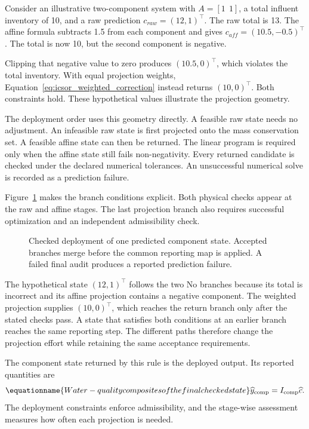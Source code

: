 Consider an illustrative two-component system with \(A=[1\ \ 1]\), a total influent inventory of 10, and a raw prediction \(c_{raw}=(12,1)^\top\). The raw total is 13. The affine formula subtracts 1.5 from each component and gives \(c_{aff}=(10.5,-0.5)^\top\). The total is now 10, but the second component is negative.

Clipping that negative value to zero produces \((10.5,0)^\top\), which violates the total inventory. With equal projection weights, Equation~\eqref{eq:icsor_weighted_correction} instead returns \((10,0)^\top\). Both constraints hold. These hypothetical values illustrate the projection geometry.

The deployment order uses this geometry directly. A feasible raw state needs no adjustment. An infeasible raw state is first projected onto the mass conservation set. A feasible affine state can then be returned. The linear program is required only when the affine state still fails non-negativity. Every returned candidate is checked under the declared numerical tolerances. An unsuccessful numerical solve is recorded as a prediction failure.

Figure~\ref{fig:ch5_checked_deployment} makes the branch conditions explicit. Both physical checks appear at the raw and affine stages. The last projection branch also requires successful optimization and an independent admissibility check.

\begin{figure}[htbp]
\centering

\caption{Checked deployment of one predicted component state. Accepted branches merge before the common reporting map is applied. A failed final audit produces a reported prediction failure.}
\label{fig:ch5_checked_deployment}
\end{figure}

The hypothetical state \((12,1)^\top\) follows the two No branches because its total is incorrect and its affine projection contains a negative component. The weighted projection supplies \((10,0)^\top\), which reaches the return branch only after the stated checks pass. A state that satisfies both conditions at an earlier branch reaches the same reporting step. The different paths therefore change the projection effort while retaining the same acceptance requirements.

The component state returned by this rule is the deployed output. Its reported quantities are
\begin{equation}
\equationname{Water-quality composites of the final checked state}
\label{eq:icsor_deployed_composites}
\widehat y_{\mathrm{comp}}=I_{\mathrm{comp}}\widehat c.
\end{equation}
The deployment constraints enforce admissibility, and the stage-wise assessment measures how often each projection is needed.

